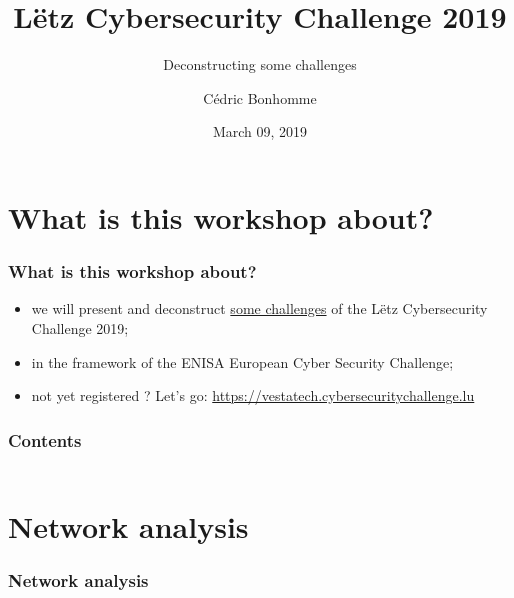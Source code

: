 \documentclass[]{beamer}
\title[Deconstructing some challenges from LCSC 2019]{Lëtz Cybersecurity Challenge 2019}
\subtitle{Deconstructing some challenges}
\author{C\'{e}dric Bonhomme}
\institute[SMILE]{Security Made In Lëtzebuerg}
\date{March 09, 2019}
\begin{document}
\begin{frame}
    \titlepage
\end{frame}


%
%
\section*{What is this workshop about?}
\begin{frame}
    \frametitle{What is this workshop about?}
    \begin{center}
        \begin{itemize}
            \item we will present and deconstruct \href{https://github.com/cscluxembourg/vestatech}{some challenges} of the Lëtz Cybersecurity Challenge 2019;
            \item in the framework of the ENISA European Cyber Security Challenge;
            \item not yet registered ? Let's go: \href{https://vestatech.cybersecuritychallenge.lu}{https://vestatech.cybersecuritychallenge.lu}
        \end{itemize}
    \end{center}
\end{frame}


\begin{frame}
    \frametitle{Contents}
    \begin{columns}[t]
        \begin{column}{5cm}
            \tableofcontents[sections={1-3}]
        \end{column}
        \begin{column}{5cm}
            \tableofcontents[sections={4-5}]
        \end{column}
    \end{columns}
\end{frame}



%
%
\section{Network analysis}
\begin{frame}
    \frametitle{Network analysis}
    \begin{columns}[t]
        \begin{column}{5cm}
            \tableofcontents[sections={1-3}, currentsection, hideothersubsections]
        \end{column}
        \begin{column}{5cm}
            \tableofcontents[sections={4-5}, currentsection, hideothersubsections]
        \end{column}
    \end{columns}
\end{frame}
 
\end{document}
